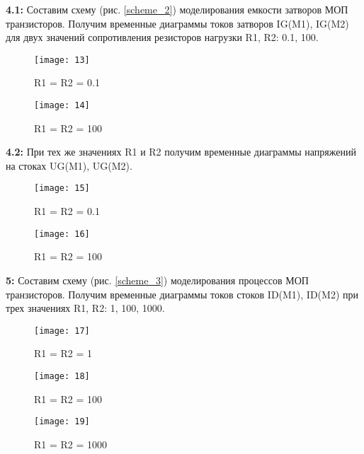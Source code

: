 \documentclass{semi}
\begin{document}
\newpage





\textbf{{\normalsize 4.1:}}
Составим схему (рис. \ref{scheme_2}) моделирования емкости затворов МОП транзисторов. Получим временные диаграммы токов затворов IG(M1), IG(M2) для двух значений сопротивления резисторов нагрузки R1, R2: 0.1, 100.
\begin{figure}[H]
	\centering
	\texttt{[image: 13]}
	\caption{R1 = R2 = 0.1}
\end{figure}

\begin{figure}[H]
	\centering
	\texttt{[image: 14]}
	\caption{R1 = R2 = 100}
\end{figure}

\textbf{{\normalsize 4.2:}}
При тех же значениях R1 и R2 получим временные диаграммы напряжений на стоках UG(M1), UG(M2).
\begin{figure}[H]
	\centering
	\texttt{[image: 15]}
	\caption{R1 = R2 = 0.1}
\end{figure}

\begin{figure}[H]
	\centering
	\texttt{[image: 16]}
	\caption{R1 = R2 = 100}
\end{figure}

\newpage





\textbf{{\normalsize 5:}}
Составим схему (рис. \ref{scheme_3}) моделирования процессов МОП транзисторов. Получим временные диаграммы токов стоков ID(M1), ID(M2) при трех значениях R1, R2: 1, 100, 1000.
\begin{figure}[H]
	\centering
	\texttt{[image: 17]}
	\caption{R1 = R2 = 1}
\end{figure}

\begin{figure}[H]
	\centering
	\texttt{[image: 18]}
	\caption{R1 = R2 = 100}
\end{figure}

\begin{figure}[H]
	\centering
	\texttt{[image: 19]}
	\caption{R1 = R2 = 1000}
\end{figure}
\end{document}
